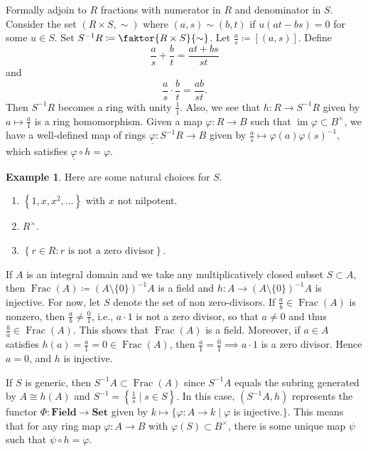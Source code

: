 \documentclass[10pt,letterpaper,cm]{nupset}
\theoremstyle{definition}
\newtheorem{exmp}[definition]{Example}
\theoremstyle{theorem}
\theoremstyle{remark}
\newcommand{\1}{\mathbf{1}}
\newcommand{\0}{\vec 0}
\DeclareMathOperator{\im}{im}
\DeclareMathOperator{\Frac}{Frac}
\begin{document}
Formally adjoin to $R$ fractions with numerator in $R$ and denominator in $S$. Consider the set $(R \times S, \sim)$ where $(a, s) \sim (b,t)$ if $u(at-bs) =0$ for some $u\in S$. Set $S^{-1}R \coloneqq  \faktor{R\times S}{\sim}$. Let $\frac{a}{s} \coloneqq  [(a,s)]$. Define $$\frac{a}{s} + \frac{b}{t} = \frac{at+bs}{st}$$ and $$\frac{a}{s}\cdot \frac{b}{t} = \frac{ab}{st}.$$ Then $S^{-1}R$ becomes a ring with unity $\frac{1}{1}$. Also, we see that $h: R \to S^{-1}R$ given by $a\mapsto \frac{a}{1}$ is a ring homomorphism. Given a map $\varphi: R \to B$ such that $\im{\varphi} \subset B^{\times}$, we have a well-defined map of rings $\underline{\varphi} : S^{-1}R \to B$ given by $\frac{a}{s} \mapsto \varphi(a) \varphi(s)^{-1}$, which satisfies $\underline{\varphi} \circ h = \varphi$. 


\begin{exmp}
Here are some natural choices for $S$.
\begin{enumerate}[label=(\alph*)]
\item  $\left\{1, x, x^2, \ldots \right\}$ with $x$ not nilpotent.
\item $R^{\times}$.
\item $\left\{r\in R : r \text{ is not a zero divisor}\right\}$.
\end{enumerate}
\end{exmp}

\smallskip

If $A$ is an integral domain and we take any multiplicatively closed subset $S\subset A$, then $\Frac(A)\coloneqq  \left(A \setminus \{0\}\right)^{-1}A$ is a field and $h : A \to \left(A \setminus \{0\}\right)^{-1}A$ is injective. For now, let $S$ denote the set of non zero-divisors.  If $\frac{a}{b} \in \Frac(A)$ is nonzero, then $\frac{a}{b} \ne \frac{0}{1}$, i.e., $a\cdot 1$ is not a zero divisor, so that $a\ne 0$ and thus $\frac{b}{a} \in \Frac(A)$. This shows that $\Frac(A)$ is a field. Moreover, if $a\in A$ satisfies $h(a) = \frac{a}{1} = 0\in \Frac(A)$, then $\frac{a}{1}= \frac{0}{1} \implies a\cdot 1$ is a zero divisor. Hence $a=0$, and $h$ is injective. 

If $S$ is generic, then $S^{-1}A \subset \Frac(A)$ since $S^{-1}A$ equals the subring generated by $A\cong h(A)$ and $S^{-1} = \left\{\frac{1}{s}\mid s\in S\right\}$. In this case, $(S^{-1}A, h)$ represents the functor $\Phi : \mathbf{Field} \to \mathbf{Set}$ given by $k \mapsto \{\varphi : A \to k \mid \varphi$ is injective.$\}$. This means that for any ring map $\varphi: A \to B$ with $\varphi(S) \subset B^{\times}$, there is some unique map $\psi$ such that $\psi \circ h = \varphi$.
\end{document}
